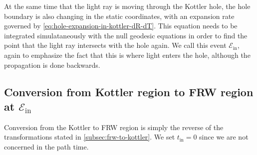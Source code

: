 At the same time that the light ray is moving through the Kottler hole, the hole boundary is also changing in the static coordinates, with an expansion rate governed by \autoref{eq:hole-expansion-in-kottler-dR-dT}. This equation needs to be integrated simulataneously with the null geodesic equations in order to find the point that the light ray intersects with the hole again. We call this event $\mathcal{E}_{\text{in}}$, again to emphasize the fact that this is where light enters the hole, although the propagation is done backwards. 

\subsection{Conversion from Kottler region to FRW region at $\mathcal{E}_{\text{in}}$}

Conversion from the Kottler to FRW region is simply the reverse of the transformations stated in \autoref{subsec:frw-to-kottler}. We set $t_{\text{in}} = 0$ since we are not concerned in the path time. 